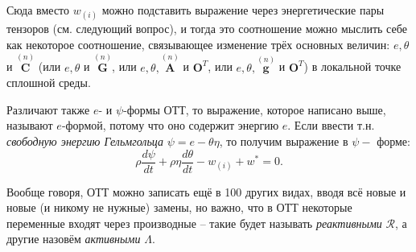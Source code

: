 Сюда вместо $w_{(i)}$ можно подставить выражение через энергетические пары тензоров
(см. следующий вопрос), и тогда
это соотношение можно мыслить себе как некоторое соотношение, связывающее изменение трёх
основных величин: $e, \theta$ и $\stackrel{(n)}{\mathbf{C}}$
(или $e, \theta$ и $\stackrel{(n)}{\mathbf{G}}$,
или $e, \theta, \stackrel{(n)}{\mathbf{A}}$ и $\mathbf{O}^T$, 
или $e, \theta, \stackrel{(n)}{\mathbf{g}}$ и $\mathbf{O}^T$)
в локальной точке сплошной среды.

Различают также $e$- и $\psi$-формы ОТТ, то выражение, которое написано выше, называют $e$-формой,
потому что оно содержит энергию $e$. Если ввести т.н. \emph{свободную энергию Гельмгольца} 
$\psi = e - \theta \eta$, то получим выражение в $\psi-$ форме:
\[
  \rho \dfrac{d\psi}{dt} + \rho\eta \dfrac{d\theta}{dt} - w_{(i)} + w^* = 0.
\]

Вообще говоря, ОТТ можно записать ещё в 100 других видах, вводя всё новые и новые (и никому не
нужные) замены, но важно, что в ОТТ некоторые переменные входят через производные -- такие
будет называть \emph{реактивными} $\mathcal{R}$, а другие назовём \emph{активными} $\Lambda$.
